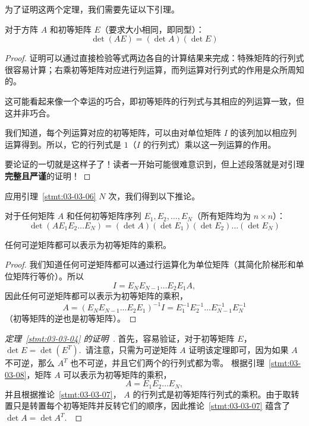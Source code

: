 
为了证明这两个定理，我们需要先证以下引理。

\begin{lemma}\label{stmt:03-03-06} 对于方阵 $A$ 和初等矩阵 $E$（要求大小相同，即同型）：
$$
\det(AE) = (\det A)(\det E)
$$\end{lemma}

\begin{proof} 证明可以通过直接检验等式两边各自的计算结果来完成：特殊矩阵的行列式很容易计算；右乘初等矩阵对应进行列运算，而列运算对行列式的作用是众所周知的。

这可能看起来像一个幸运的巧合，即初等矩阵的行列式与其相应的列运算一致，但这并非巧合。

我们知道，每个列运算对应的初等矩阵，可以由对单位矩阵 $I$ 的该列加以相应列运算得到。所以，它的行列式是 $1$（$I$ 的行列式）乘以这一列运算的作用。

要论证的一切就是这样子了！读者一开始可能很难意识到，但上述段落就是对引理\textbf{完整且严谨}的证明！\end{proof}

应用引理~\ref{stmt:03-03-06} $N$ 次，我们得到以下推论。

\begin{corollary}\label{stmt:03-03-07}
对于任何矩阵 $A$ 和任何初等矩阵序列 $E_1, E_2, \dots, E_N$（所有矩阵均为 $n \times n$）：
$$
\det(A E_1 E_2 \dots E_N) = (\det A)(\det E_1)(\det E_2) \dots (\det E_N)
$$
\end{corollary}

\begin{lemma}\label{stmt:03-03-08} 任何可逆矩阵都可以表示为初等矩阵的乘积。\end{lemma}

\begin{proof} 我们知道任何可逆矩阵都可以通过行运算化为单位矩阵（其简化阶梯形和单位矩阵行等价）。所以
$$I = E_N E_{N-1} \dots E_2 E_1 A,$$
因此任何可逆矩阵都可以表示为初等矩阵的乘积，
$$A = (E_N E_{N-1} \dots E_2 E_1)^{-1} I = E_1^{-1} E_2^{-1} \dots E_{N-1}^{-1} E_N^{-1}$$
（初等矩阵的逆也是初等矩阵）。\end{proof}

\begin{proof}[\normalfont\heiti 定理~\ref{stmt:03-03-04} 的证明~\nopunct] 首先，容易验证，对于初等矩阵 $E$， $\det E = \det(E^T)$.~请注意，只需为可逆矩阵 $A$ 证明该定理即可，因为如果 $A$ 不可逆，那么 $A^T$ 也不可逆，并且它们两个的行列式都为零。
根据引理~\ref{stmt:03-03-08}，矩阵 $A$ 可以表示为初等矩阵的乘积，
$$A = E_1 E_2 \dots E_N,$$
并且根据推论~\ref{stmt:03-03-07}， $A$ 的行列式是初等矩阵行列式的乘积。由于取转置只是转置每个初等矩阵并反转它们的顺序，因此推论~\ref{stmt:03-03-07} 蕴含了 $\det A = \det A^T$.~\end{proof}

